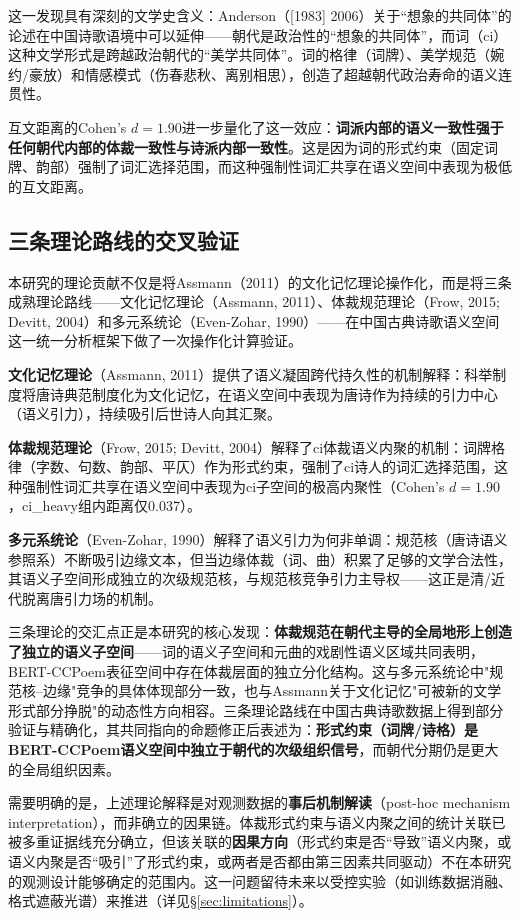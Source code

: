 \documentclass[12pt,a4paper]{article}
\numberwithin{equation}{section}
\begin{document}
这一发现具有深刻的文学史含义：Anderson（[1983] 2006）关于“想象的共同体”的论述在中国诗歌语境中可以延伸——朝代是政治性的“想象的共同体”，而词（ci）这种文学形式是跨越政治朝代的“美学共同体”。词的格律（词牌）、美学规范（婉约/豪放）和情感模式（伤春悲秋、离别相思），创造了超越朝代政治寿命的语义连贯性。

互文距离的Cohen's $d=1.90$进一步量化了这一效应：\textbf{词派内部的语义一致性强于任何朝代内部的体裁一致性与诗派内部一致性}。这是因为词的形式约束（固定词牌、韵部）强制了词汇选择范围，而这种强制性词汇共享在语义空间中表现为极低的互文距离。

\subsection{三条理论路线的交叉验证}

本研究的理论贡献不仅是将Assmann（2011）的文化记忆理论操作化，而是将三条成熟理论路线——文化记忆理论（Assmann, 2011）、体裁规范理论（Frow, 2015; Devitt, 2004）和多元系统论（Even-Zohar, 1990）——在中国古典诗歌语义空间这一统一分析框架下做了一次操作化计算验证。

\textbf{文化记忆理论}（Assmann, 2011）提供了语义凝固跨代持久性的机制解释：科举制度将唐诗典范制度化为文化记忆，在语义空间中表现为唐诗作为持续的引力中心（语义引力），持续吸引后世诗人向其汇聚。

\textbf{体裁规范理论}（Frow, 2015; Devitt, 2004）解释了ci体裁语义内聚的机制：词牌格律（字数、句数、韵部、平仄）作为形式约束，强制了ci诗人的词汇选择范围，这种强制性词汇共享在语义空间中表现为ci子空间的极高内聚性（Cohen's $d=1.90$，ci\_heavy组内距离仅0.037）。

\textbf{多元系统论}（Even-Zohar, 1990）解释了语义引力为何非单调：规范核（唐诗语义参照系）不断吸引边缘文本，但当边缘体裁（词、曲）积累了足够的文学合法性，其语义子空间形成独立的次级规范核，与规范核竞争引力主导权——这正是清/近代脱离唐引力场的机制。

三条理论的交汇点正是本研究的核心发现：\textbf{体裁规范在朝代主导的全局地形上创造了独立的语义子空间}——词的语义子空间和元曲的戏剧性语义区域共同表明，BERT-CCPoem表征空间中存在体裁层面的独立分化结构。这与多元系统论中"规范核--边缘"竞争的具体体现部分一致，也与Assmann关于文化记忆"可被新的文学形式部分挣脱"的动态性方向相容。三条理论路线在中国古典诗歌数据上得到部分验证与精确化，其共同指向的命题修正后表述为：\textbf{形式约束（词牌/诗格）是BERT-CCPoem语义空间中独立于朝代的次级组织信号}，而朝代分期仍是更大的全局组织因素。

需要明确的是，上述理论解释是对观测数据的\textbf{事后机制解读}（post-hoc mechanism interpretation），而非确立的因果链。体裁形式约束与语义内聚之间的统计关联已被多重证据线充分确立，但该关联的\textbf{因果方向}（形式约束是否“导致”语义内聚，或语义内聚是否“吸引”了形式约束，或两者是否都由第三因素共同驱动）不在本研究的观测设计能够确定的范围内。这一问题留待未来以受控实验（如训练数据消融、格式遮蔽光谱）来推进（详见§\ref{sec:limitations}）。
\end{document}
